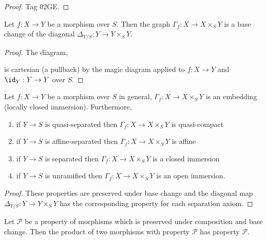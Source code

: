 \documentclass[12pt]{article}
\begin{document}
\begin{proof}
Tag 02GE.
\end{proof}

\begin{cor}
Let $f : X \to Y$ be a morphism over $S$. Then the graph $\Gamma_f : X \to X \times_S Y$ is a base change of the diagonal $\Delta_{Y/S} : Y \to Y \times_S Y$.
\end{cor}

\begin{proof}
The diagram,
\begin{center}
\end{center}
is cartesian (a pullback) by the magic diagram applied to $f : X \to Y$ and $\id_Y : Y \to Y$ over $S$.
\end{proof}

\begin{cor}
Let $f : X \to Y$ be a morphism over $S$ in general, $\Gamma_f : X \to X \times_S Y$ is an embedding (locally closed immersion). Furthermore,
\begin{enumerate}
\item if $Y \to S$ is quasi-separated then $\Gamma_f : X \to X \times_S Y$ is quasi-compact
\item if $Y \to S$ is affine-separated then $\Gamma_f : X \to X \times_S Y$ is affine
\item if $Y \to S$ is separated then $\Gamma_f : X \to X \times_S Y$ is a closed immersion
\item if $Y \to S$ is unramified then $\Gamma_f : X \to X \times_S Y$ is an open immersion.
\end{enumerate}
\end{cor}

\begin{proof}
These properties are preserved under base change and the diagonal map $\Delta_{Y/S} : Y \to Y \times_S Y$ has the corresponding property for each separation axiom. 
\end{proof}

\newcommand{\cP}{\mathcal{P}}

\begin{prop}
Let $\cP$ be a property of morphisms which is preserved under composition and base change. Then the product of two morphisms with property $\cP$ has property $\cP$.
\end{prop}
\end{document}
